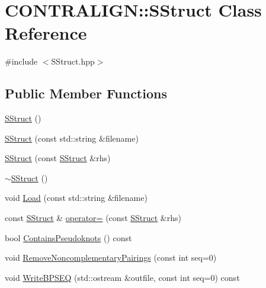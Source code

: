 \hypertarget{class_c_o_n_t_r_a_l_i_g_n_1_1_s_struct}{\section{C\+O\+N\+T\+R\+A\+L\+I\+G\+N\+:\+:S\+Struct Class Reference}
\label{class_c_o_n_t_r_a_l_i_g_n_1_1_s_struct}
}


{\ttfamily \#include $<$S\+Struct.\+hpp$>$}

\subsection*{Public Member Functions}
\begin{DoxyCompactItemize}
\item 
\hyperlink{class_c_o_n_t_r_a_l_i_g_n_1_1_s_struct_a58ee9a2053b13b24116b6a47be23e82f}{S\+Struct} ()
\item 
\hyperlink{class_c_o_n_t_r_a_l_i_g_n_1_1_s_struct_ae80ebc2151d3d69bdb8c0c6c062bbef1}{S\+Struct} (const std\+::string \&filename)
\item 
\hyperlink{class_c_o_n_t_r_a_l_i_g_n_1_1_s_struct_ac9dba145eeade69038b9f29cbc1ca7b5}{S\+Struct} (const \hyperlink{class_c_o_n_t_r_a_l_i_g_n_1_1_s_struct}{S\+Struct} \&rhs)
\item 
\hyperlink{class_c_o_n_t_r_a_l_i_g_n_1_1_s_struct_aef472f81f252999a8fa9d8f56c6026e2}{$\sim$\+S\+Struct} ()
\item 
void \hyperlink{class_c_o_n_t_r_a_l_i_g_n_1_1_s_struct_ab75b5c5dead14ed6112a04381af060fe}{Load} (const std\+::string \&filename)
\item 
const \hyperlink{class_c_o_n_t_r_a_l_i_g_n_1_1_s_struct}{S\+Struct} \& \hyperlink{class_c_o_n_t_r_a_l_i_g_n_1_1_s_struct_a53ba7a38776b355ec1c7f511b762d112}{operator=} (const \hyperlink{class_c_o_n_t_r_a_l_i_g_n_1_1_s_struct}{S\+Struct} \&rhs)
\item 
bool \hyperlink{class_c_o_n_t_r_a_l_i_g_n_1_1_s_struct_a9126b795a3aac062ea5ddea558f31650}{Contains\+Pseudoknots} () const 
\item 
void \hyperlink{class_c_o_n_t_r_a_l_i_g_n_1_1_s_struct_adf88a89b209e7a409d209e8342185468}{Remove\+Noncomplementary\+Pairings} (const int seq=0)
\item 
void \hyperlink{class_c_o_n_t_r_a_l_i_g_n_1_1_s_struct_ac81e8f499dfaf6a4651569e9ee7ade27}{Write\+B\+P\+S\+E\+Q} (std\+::ostream \&outfile, const int seq=0) const 
\item 

\end{DoxyCompactItemize}

